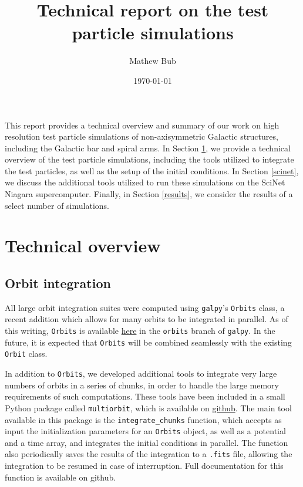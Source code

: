 \documentclass[10pt]{article}
\title{Technical report on the test particle simulations}
\author{Mathew Bub}
\date{\today}
\begin{document}
\maketitle

This report provides a technical overview and summary of our work on high resolution test particle simulations of non-axisymmetric Galactic structures, including the Galactic bar and spiral arms. In Section \ref{tech}, we provide a technical overview of the test particle simulations, including the tools utilized to integrate the test particles, as well as the setup of the initial conditions. In Section \ref{scinet}, we discuss the additional tools utilized to run these simulations on the SciNet Niagara supercomputer. Finally, in Section \ref{results}, we consider the results of a select number of simulations.

\section{Technical overview} \label{tech}

\subsection{Orbit integration} \label{integration}
All large orbit integration suites were computed using \texttt{galpy}'s \texttt{Orbits} class, a recent addition which allows for many orbits to be integrated in parallel. As of this writing, \texttt{Orbits} is available \href{https://github.com/jobovy/galpy/tree/orbits}{here} in the \texttt{orbits} branch of \texttt{galpy}. In the future, it is expected that \texttt{Orbits} will be combined seamlessly with the existing \texttt{Orbit} class.

In addition to \texttt{Orbits}, we developed additional tools to integrate very large numbers of orbits in a series of chunks, in order to handle the large memory requirements of such computations. These tools have been included in a small Python package called \texttt{multiorbit}, which is available on \href{https://github.com/mwbub/multiorbit}{github}. The main tool available in this package is the \texttt{integrate\_chunks} function, which accepts as input the initialization parameters for an \texttt{Orbits} object, as well as a potential and a time array, and integrates the initial conditions in parallel. The function also periodically saves the results of the integration to a \texttt{.fits} file, allowing the integration to be resumed in case of interruption. Full documentation for this function is available on github.
\end{document}
